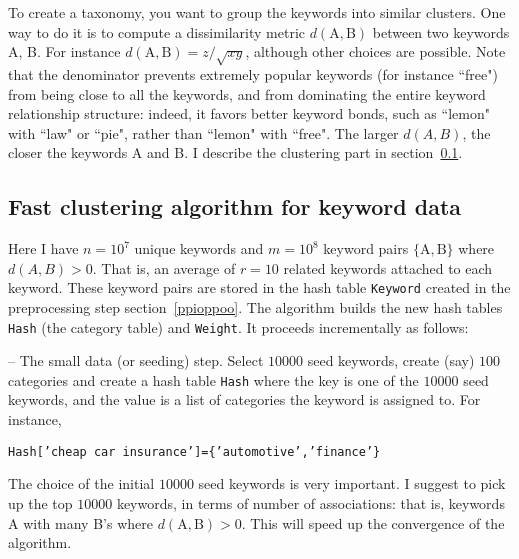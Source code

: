\documentclass[oneside,10pt]{book}
\begin{document}

\noindent To create a taxonomy, you want to group the keywords into similar clusters. One way to do it is to compute a \textcolor{index}{dissimilarity metric} 
$d(\text{A}, \text{B})$ between two keywords A, B. For instance $d(\text{A}, \text{B}) = z / \sqrt{xy}$, although other choices are possible. Note that the denominator prevents extremely popular keywords (for instance ``free") from being close to all the keywords, and from dominating the entire keyword relationship structure: indeed, it favors better keyword bonds, such as ``lemon" with ``law" or ``pie", rather than ``lemon" with ``free". The larger $d(A, B)$, the closer the keywords A and B. 
I describe the clustering part in section~\ref{cvbsdwq}.



\subsection{Fast clustering algorithm for keyword data}\label{cvbsdwq}


Here  I have $n = 10^7$ unique keywords and $m=10^8$  keyword pairs $\{\text{A}, \text{B}\}$ 
 where $d(A,B)>0$. That is, an average of $r = 10$ related keywords attached to each keyword. These keyword pairs are stored in the hash table \texttt{Keyword} created in the preprocessing step section~\ref{ppioppoo}. 
The algorithm builds the new hash tables \texttt{Hash} (the category table) and \texttt{Weight}. It proceeds incrementally  as follows:\vspace{1ex}



 -- The small data (or seeding) step. Select $\num{10000}$ seed keywords, create (say) $100$ categories and create a hash table \texttt{Hash} where the key is one of the 
$\num{10000}$ seed keywords, and the value is a list of categories the keyword is assigned to. For instance, 
\begin{center}
\texttt{Hash['cheap car insurance']=\{'automotive','finance'\}}
\end{center}
The choice of the initial $\num{10000}$ seed keywords is very important. I suggest to pick up the top $\num{10000}$ keywords, in terms of number of associations: that is, keywords A with many B's where $d(\text{A}, \text{B}) > 0$. This will speed up the convergence of the algorithm.\vspace{1ex}
\end{document}
